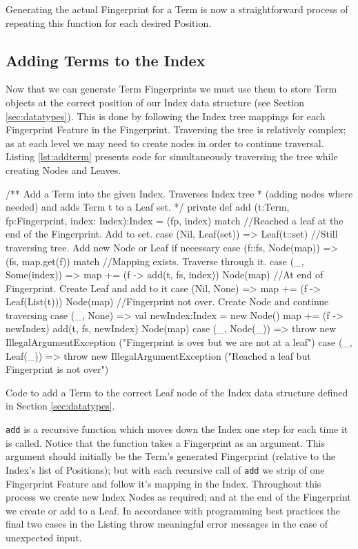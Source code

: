 Generating the actual Fingerprint for a Term is now a straightforward process
of repeating this function for each desired Position.

\subsection{Adding Terms to the Index}
Now that we can generate Term Fingerprints we must use them to store Term objects
at the correct position of our Index data structure (see Section \ref{sec:datatypes}).
This is done by following the Index tree mappings for each Fingerprint Feature in
the Fingerprint. Traversing the tree is relatively complex; as at each
level we may need to create nodes in order to continue traversal. Listing \ref{lst:addterm}
presents code for simultaneously traversing the tree while creating Nodes and Leaves.
\begin{listing}[H]
\begin{scalacode}
/** Add a Term into the given Index. Traverses Index tree
  * (adding nodes where needed) and adds Term t to a Leaf set. */
private def add (t:Term, fp:Fingerprint, index: Index):Index =
(fp, index)  match {
  //Reached a leaf at the end of the Fingerprint. Add to set.
  case (Nil,   Leaf(set)) => Leaf(t::set)
  //Still traversing tree. Add new Node or Leaf if necessary
  case (f::fs, Node(map)) => (fs, map.get(f)) match {
    //Mapping exists. Traverse through it.
    case (_,   Some(index)) => {map += (f -> add(t, fs, index))
                                Node(map)}
    //At end of Fingerprint. Create Leaf and add to it
    case (Nil, None) => {map += (f -> Leaf(List(t)))
                         Node(map)}
    //Fingerprint not over. Create Node and continue traversing
    case (_,   None) => {val newIndex:Index = new Node()
                         map += (f -> newIndex)
                         add(t, fs, newIndex)
                         Node(map)}
  }
  case (_, Node(_)) => throw new IllegalArgumentException
                ("Fingerprint is over but we are not at a leaf")
  case (_, Leaf(_)) => throw new IllegalArgumentException
                ("Reached a leaf but Fingerprint is not over")
}
\end{scalacode}
\caption{Code to add a Term to the correct Leaf node of the Index data
structure defined in Section \ref{sec:datatypes}.}
\label{lst:addterm}
\end{listing}
\verb!add! is a recursive function which moves down the Index one step for
each time it is called. Notice that the function takes a Fingerprint as an argument. This argument
should initially be the Term's generated Fingerprint (relative to the Index's list of Positions);
but with each recursive call of \verb!add! we strip of one Fingerprint Feature and follow
it's mapping in the Index. Throughout this process we create new Index Nodes as required;
and at the end of the Fingerprint we create or add to a Leaf.
In accordance with programming best practices the final two cases in the Listing
throw meaningful error messages in the case of unexpected input.


